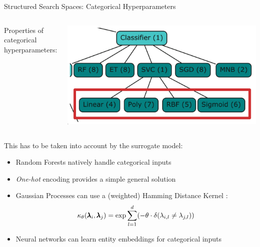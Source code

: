 \begin{frame}[c]{Structured Search Spaces: Categorical Hyperparameters}

\begin{columns}[T]

\medskip
Properties of categorical hyperparameters:


\vspace{0.5cm}
\includegraphics[width=1\textwidth]{images/categ_cond_params/categorical.png}
%
\end{columns}

\pause
\vspace*{-0.4cm}
This has to be taken into account by the surrogate model:
%
\begin{itemize}
    \item Random Forests \alert{natively} handle categorical inputs 
    \item \emph{One-hot} encoding provides a simple general solution
    \item Gaussian Processes can use a (weighted) \alert{Hamming Distance Kernel} :
\vspace*{-0.2cm}
\begin{equation*}
    \kappa_{\theta}(\pmb{\lambda}_i, \pmb{\lambda}_j) = \exp{\sum_{l=1}^d (-\theta \cdot \delta(\lambda_{i,l} \neq \lambda_{j,l}))}
\end{equation*}

\vspace*{-0.2cm}
\item Neural networks can learn \alert{entity embeddings} for categorical inputs 
\end{itemize}
%
\end{frame}
